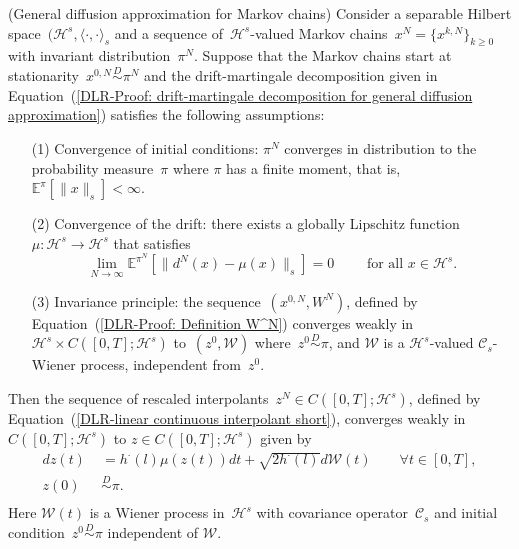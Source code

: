\begin{proposition}\autocite[Proposition 3.1]{Pillai2012}(General diffusion approximation for Markov chains)
  \label{DLR-Proof: Proposition General diffusion approximation}
  Consider a separable Hilbert space~$(\mathcal{H}^s, \langle \cdot, \cdot \rangle_s$ and a sequence of~$\mathcal{H}^s$-valued Markov chains~$x^N = \{ x^{k,N} \}_{k \geq 0}$ with invariant distribution~$\pi^N$. Suppose that the Markov chains start at stationarity~$x^{0,N} \stackrel{D}{\sim} \pi^N$ and the drift-martingale decomposition given in Equation~(\ref{DLR-Proof: drift-martingale decomposition for general diffusion approximation}) satisfies the following assumptions:
  \begin{enumerate}
    \item[(1)] Convergence of initial conditions: $\pi^N$ converges in distribution to the probability measure~$\pi$ where $\pi$ has a finite moment, that is, $\mathbb{E}^{\pi}[\|x\|_s]<\infty$. 
    \item[(2)] Convergence of the drift: there exists a globally Lipschitz function~$\mu:\mathcal{H}^s \to \mathcal{H}^s$ that satisfies
    \begin{equation*}
      \lim_{N \to \infty} \mathbb{E}^{\pi^N}[ \|  d^N(x) - \mu(x) \|_{s} ] = 0 \qquad \text{ for all } x \in \mathcal{H}^s.
    \end{equation*}
    \item[(3)] Invariance principle: the sequence~$(x^{0,N}, W^N)$, defined by Equation~(\ref{DLR-Proof: Definition W^N}) converges weakly in $\mathcal{H}^s \times C([0,T]; \mathcal{H}^s)$ to~$(z^0, \mathcal{W})$ where~$z^0 \stackrel{D}{\sim} \pi$, and $\mathcal{W}$ is a $\mathcal{H}^s$-valued $\mathcal{C}_s$-Wiener process, independent from~$z^0$.
  \end{enumerate}
  
  Then the sequence of rescaled interpolants~$z^N \in C([0,T]; \mathcal{H}^s)$, defined by Equation~(\ref{DLR-linear continuous interpolant short}), converges weakly in $ C([0,T]; \mathcal{H}^s)$ to $z \in  C([0,T]; \mathcal{H}^s)$ given by
  \begin{equation*}
    \begin{split}
     dz(t) & \;=   h^{\cdot}(l) \mu(z(t)) dt + \sqrt{2 h^{\cdot}(l)} d\mathcal{W}(t) \qquad \forall t \in [0,T], \\
     z(0) & \; \stackrel{D}{\sim} \pi.\\
    \end{split}
  \end{equation*}
  Here $\mathcal{W}(t)$ is a Wiener process in~$\mathcal{H}^s$ with covariance operator~$\mathcal{C}_s$ and initial condition~$z^0 \stackrel{D}{\sim} \pi$ independent of $\mathcal{W}$.

\end{proposition}

